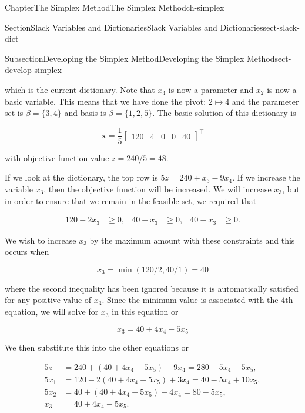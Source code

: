 \documentclass[oneside,10pt,]{book}
\numberwithin{equation}{section}
\newcommand{\amp}{&}
\begin{document}
\begin{chapterptx}{Chapter}{The Simplex Method}{}{The Simplex Method}{}{}{ch-simplex}
\begin{sectionptx}{Section}{Slack Variables and Dictionaries}{}{Slack Variables and Dictionaries}{}{}{sect-slack-dict}
\begin{subsectionptx}{Subsection}{Developing the Simplex Method}{}{Developing the Simplex Method}{}{}{sect-develop-simplex}
%
\par
which is the current dictionary. Note that \(x_4\) is now a parameter and \(x_2\) is now a basic variable. This means that we have done the pivot: \(2\mapsto 4\) and the parameter set is \(\beta = \{3,4\}\) and basis is \(\beta = \{1,2,5\}\). The basic solution of this dictionary is%
\par
%
\begin{equation*}
\boldsymbol{x}= \frac{1}{5}\left[\begin{array}{rr|rrr} 120 \amp 4 \amp 0 \amp 0 \amp 40\end{array}\right]^{\intercal}
\end{equation*}
%
\par
with objective function value \(z=240/5=48\).%
\par
If we look at the dictionary, the top row is \(5z=240+x_3-9x_4\). If we increase the variable \(x_3\), then the objective function will be increased. We will increase \(x_3\), but in order to ensure that we remain in the feasible set, we required that%
\par
%
\begin{align*}
120-2x_3\amp\geq 0,\amp40+x_3\amp\geq 0,\amp40-x_3\amp\geq 0.
\end{align*}
%
\par
We wish to increase \(x_3\) by the maximum amount with these constraints and this occurs when%
\par
%
\begin{equation*}
x_3 = \min(120/2,40/1) = 40
\end{equation*}
%
\par
where the second inequality has been ignored because it is automatically satisfied for any positive value of \(x_3\). Since the minimum value is associated with the 4th equation, we will solve for \(x_3\) in this equation or%
\par
%
\begin{equation*}
x_3 = 40 + 4x_4 - 5 x_5
\end{equation*}
%
\par
We then substitute this into the other equations or%
\par
%
\begin{align*}
5 z \amp = 240 + (40+4x_4-5x_5) - 9 x_4 = 280 - 5x_4 - 5 x_5,\\
5 x_1 \amp = 120 - 2(40+4x_4-5x_5) + 3 x_4 = 40 - 5x_4 + 10 x_5,\\
5x_2 \amp =40 + (40+4x_4-5x_5) - 4x_4 = 80 - 5x_5, \\
x_3 \amp = 40+4x_4-5x_5.

\end{align*}
\end{subsectionptx}
\end{sectionptx}
\end{chapterptx}
\end{document}
